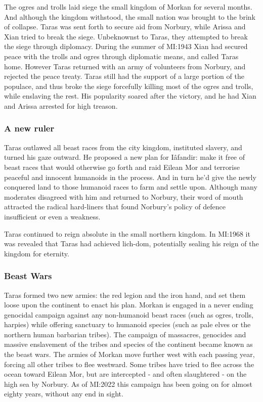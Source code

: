 The ogres and trolls laid siege the small kingdom of Morkan for several
months. And although the kingdom withstood, the small nation was brought to
the brink of collapse. Taras was sent forth to secure aid from Norbury, while
Arissa and Xian tried to break the siege. Unbeknownst to Taras, they attempted
to break the siege through diplomacy. During the summer of MI:1943 Xian
had secured peace with the trolls and ogres through diplomatic means, and
called Taras home. However Taras returned with an army of volunteers from
Norbury, and rejected the peace treaty. Taras still had the support of a large
portion of the populace, and thus broke the siege forcefully killing most of the
ogres and trolls, while enslaving the rest. His popularity soared after the
victory, and he had Xian and Arissa arrested for high treason.

\subsubsection{A new ruler}

Taras outlawed all beast races from the city kingdom, instituted slavery,
and turned his gaze outward. He proposed a new plan for Iâfandir: make it free
of beast races that would otherwise go forth and raid Eilean Mor and terrorise
peaceful and innocent humanoids in the process. And in turn he'd give the newly
conquered land to those humanoid races to farm and settle upon. Although many
moderates disagreed with him and returned to Norbury, their word of mouth
attracted the radical hard-liners that found Norbury's policy of defence
insufficient or even a weakness.

Taras continued to reign absolute in the small northern kingdom. In MI:1968 it
was revealed that Taras had achieved lich-dom, potentially sealing his reign
of the kingdom for eternity.

\subsubsection{Beast Wars}
\label{sec:Beast Wars}

Taras formed two new armies: the red legion and the iron hand, and set them
loose upon the continent to enact his plan. Morkan is engaged in a never
ending genocidal campaign against any non-humanoid beast races (such as ogres,
trolls, harpies) while offering sanctuary to humanoid species (such as pale
elves or the northern human barbarian tribes). The campaign of massacres,
genocides and massive enslavement of the tribes and species of the continent
became known as the beast wars. The armies of Morkan move further west with
each passing year, forcing all other tribes to flee westward. Some tribes have
tried to flee across the ocean toward Eilean Mor, but are intercepted - and
often slaughtered - on the high sea by Norbury. As of MI:2022 this campaign
has been going on for almost eighty years, without any end in sight.

